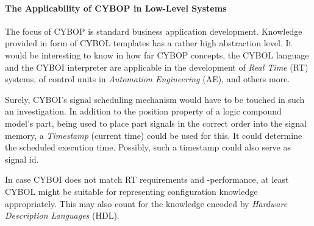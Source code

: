 %
%
%
%
%
%
%

\paragraph{The Applicability of CYBOP in Low-Level Systems}
\label{applicability_of_cybop_heading}

The focus of CYBOP is standard business application development. Knowledge
provided in form of CYBOL templates has a rather high abstraction level. It
would be interesting to know in how far CYBOP concepts, the CYBOL language and
the CYBOI interpreter are applicable in the development of \emph{Real Time}
(RT) systems, of control units in \emph{Automation Engineering} (AE), and
others more.

Surely, CYBOI's signal scheduling mechanism would have to be touched in such an
investigation. In addition to the position property of a logic compound model's
part, being used to place part signals in the correct order into the signal
memory, a \emph{Timestamp} (current time) could be used for this. It could
determine the scheduled execution time. Possibly, such a timestamp could also
serve as signal id.

In case CYBOI does not match RT requirements and -performance, at least CYBOL
might be suitable for representing configuration knowledge appropriately. This
may also count for the knowledge encoded by \emph{Hardware Description Languages}
(HDL).
